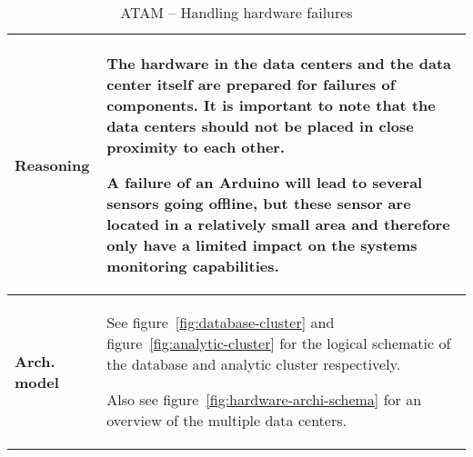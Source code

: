 \begin{table}[H]
\begin{tabular}{L{0.2\textwidth} L{0.6\textwidth}}
		\midrule
		\textbf{Reasoning} 		& The hardware in the data centers and the data center itself are prepared for failures of components. It is important to note that the data centers should not be placed in close proximity to each other. 
		
		A failure of an Arduino will lead to several sensors going offline, but these sensor are located in a relatively small area and therefore only have a limited impact on the systems monitoring capabilities. \\
		\midrule
		\textbf{Arch. model} 	& See figure~\ref{fig:database-cluster} and figure~\ref{fig:analytic-cluster} for the logical schematic of the database and analytic cluster respectively.
		
		Also see figure~\ref{fig:hardware-archi-schema} for an overview of the multiple data centers. \\
								 
	 \bottomrule
	\end{tabular}
	\caption{ATAM -- Handling hardware failures}
	\label{ATAM:hardware-failure}
\end{table}

